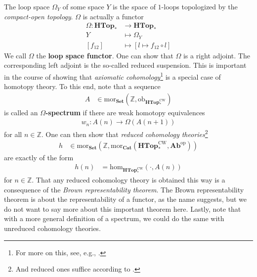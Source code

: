 \begin{exa}
\label{exa:loopradjoint}
The loop space $\Omega_{Y}$ of some space $Y$ is the space of $1$-loops topologized by the \textit{compact-open topology}.
$\Omega$ is actually a functor
\begin{align*}
  \Omega
  \colon
  \mathbf{HTop}_{\ast}
  &\rightarrow
  \mathbf{HTop}_{\ast}
  \\
  Y
  &\mapsto
  \Omega_{Y}
  \\
  [f_{12}]
  &\mapsto
  \left[
    l
    \mapsto
    f_{12}
    \circ
    l
  \right]
\end{align*}
We call $\Omega$ the \textbf{loop space functor}.
One can show that $\Omega$ is a right adjoint.
The corresponding left adjoint is the so-called reduced suspension.
This is important in the course of showing that \textit{axiomatic cohomology}\footnote{For more on this, see, e.g., \cite{00000011}.} is a special case of homotopy theory.
To this end, note that a sequence
\begin{align*}
  A
  &\in
  \mathrm{mor}_{\mathbf{Set}}
  \left(
    \mathbb{Z},
    \mathrm{ob}_{\mathbf{HTop}_{\ast}^{\textrm{CW}}}
  \right)
\end{align*}
is called an \textbf{$\Omega$-spectrum} if there are weak homotopy equivalences
\begin{align*}
  w_{n}
  \colon
  A(n)
  \rightarrow
  \Omega(A(n+1))
\end{align*}
for all $n \in \mathbb{Z}$.
One can then show that \textit{reduced cohomology theories}\footnote{And reduced ones suffice according to \cite{8b5861fc}.}
\begin{align*}
  h
  &\in
  \mathrm{mor}_{\mathbf{Set}}
  \left(
    \mathbb{Z},
    \mathrm{mor}_{\mathbf{Cat}}
    \left(
      \mathbf{HTop}_{\ast}^{\textrm{CW}},
      \mathbf{Ab}^{\textrm{op}}
    \right)
  \right)
\end{align*}
are exactly of the form
\begin{align*}
  h(n)
  &=
  \mathrm{hom}_{\mathbf{HTop}_{\ast}^{\textrm{CW}}}(\cdot,A(n))
\end{align*}
for $n \in \mathbb{Z}$.
That any reduced cohomology theory is obtained this way is a consequence of the \textit{Brown representability theorem}.
The Brown representability theorem is about the representability of a functor, as the name suggests, but we do not want to say more about this important theorem here.
Lastly, note that with a more general definition of a spectrum, we could do the same with unreduced cohomology theories.
\end{exa}
